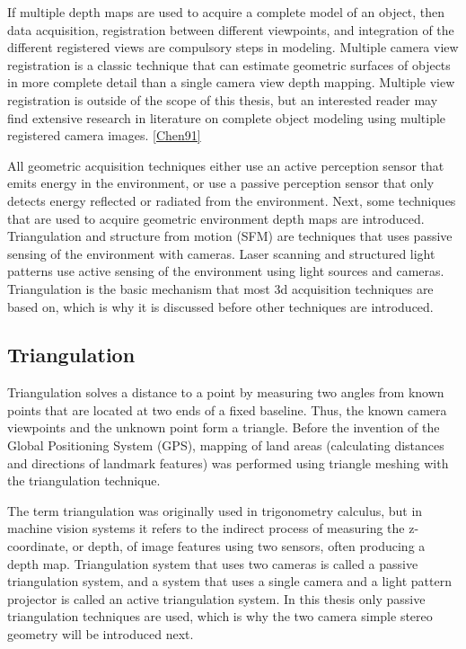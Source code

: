 \documentclass[12pt,a4paper,oneside,pdftex]{report}
\begin{document}
{If multiple depth maps are used to acquire a complete model of an object, then data acquisition, registration between different viewpoints, and integration of the different registered views are compulsory steps in modeling.  Multiple camera view registration is a classic technique that can estimate geometric surfaces of objects in more complete detail than a single camera view depth mapping. Multiple view registration is outside of the scope of this thesis, but an interested reader may find extensive research in literature on complete object modeling using multiple registered camera images.  \ref{Chen91}

All geometric acquisition techniques either use an active perception sensor that emits energy in the environment, or use a passive perception sensor that only detects energy reflected or radiated from the environment. Next, some techniques that are used to acquire geometric environment depth maps are introduced. Triangulation and structure from motion (SFM) are techniques that uses passive sensing of the environment with cameras. Laser scanning and structured light patterns use active sensing of the environment using light sources and cameras. Triangulation is the basic mechanism that most 3d acquisition techniques are based on, which is why it is discussed before other techniques are introduced.

\subsection{Triangulation}
\label{subsection:triangulation}

Triangulation solves a distance to a point by measuring two angles from known points that are located at two ends of a fixed baseline. Thus, the known camera viewpoints and the unknown point form a triangle. Before the invention of the Global Positioning System (GPS), mapping of land areas (calculating distances and directions of landmark features) was performed using triangle meshing with the triangulation technique.

The term triangulation was originally used in trigonometry calculus, but in machine vision systems it refers to the indirect process of measuring the z-coordinate, or depth, of image features using two sensors, often producing a depth map. Triangulation system that uses two cameras is called a passive triangulation system, and a system that uses a single camera and a light pattern projector is called an active triangulation system. In this thesis only passive triangulation techniques are used, which is why the two camera simple stereo geometry will be introduced next.

}
\end{document}
